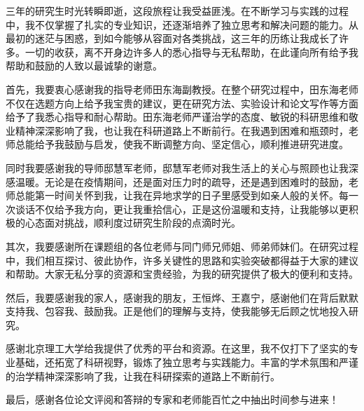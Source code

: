 %
%
%
%

\begin{acknowledgements}

三年的研究生时光转瞬即逝，这段旅程让我受益匪浅。在不断学习与实践的过程中，我不仅掌握了扎实的专业知识，还逐渐培养了独立思考和解决问题的能力。从最初的迷茫与困惑，到如今能够从容面对各类挑战，这三年的历练让我成长了许多。一切的收获，离不开身边许多人的悉心指导与无私帮助，在此谨向所有给予我帮助和鼓励的人致以最诚挚的谢意。

首先，我要衷心感谢我的指导老师田东海副教授。在整个研究过程中，田东海老师不仅在选题方向上给予我宝贵的建议，更在研究方法、实验设计和论文写作等方面给予了我悉心指导和耐心帮助。田东海老师严谨治学的态度、敏锐的科研思维和敬业精神深深影响了我，也让我在科研道路上不断前行。在我遇到困难和瓶颈时，老师总能给予我鼓励与启发，使我不断调整方向、坚定信心，顺利推进研究进度。

同时我要感谢我的导师邸慧军老师，邸慧军老师对我生活上的关心与照顾也让我深感温暖。无论是在疫情期间，还是面对压力时的疏导，还是遇到困难时的鼓励，老师总能第一时间关怀到我，让我在异地求学的日子里感受到如亲人般的关怀。每一次谈话不仅给予我方向，更让我重拾信心，正是这份温暖和支持，让我能够以更积极的心态面对挑战，顺利度过研究生阶段的点滴时光。

其次，我要感谢所在课题组的各位老师与同门师兄师姐、师弟师妹们。在研究过程中，我们相互探讨、彼此协作，许多关键性的思路和实验突破都得益于大家的建议和帮助。大家无私分享的资源和宝贵经验，为我的研究提供了极大的便利和支持。

然后，我要感谢我的家人，感谢我的朋友，王恒烨、王嘉宁，感谢他们在背后默默支持我、包容我、鼓励我。正是他们的理解与支持，使我能够无后顾之忧地投入研究。

感谢北京理工大学给我提供了优秀的平台和资源。在这里，我不仅打下了坚实的专业基础，还拓宽了科研视野，锻炼了独立思考与实践能力。丰富的学术氛围和严谨的治学精神深深影响了我，让我在科研探索的道路上不断前行。

最后，感谢各位论文评阅和答辩的专家和老师能百忙之中抽出时间参与进来！


\end{acknowledgements}
